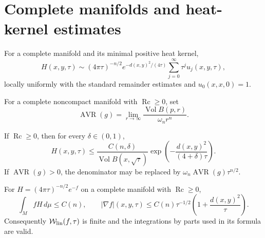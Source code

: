 \section{Complete manifolds and heat-kernel estimates}

\begin{theorem}
\label{thm:chow-ii-ch16-heat-parametrix}

For a complete manifold and its minimal positive heat kernel,
\[
H(x,y,\tau)\sim(4\pi\tau)^{-n/2}e^{-d(x,y)^2/(4\tau)}
 \sum_{j=0}^{\infty}\tau^ju_j(x,y,\tau),
\]
locally uniformly with the standard remainder estimates and
$u_0(x,x,0)=1$.
\end{theorem}

\begin{definition}
\label{def:chow-ii-ch16-avr}

For a complete noncompact manifold with $\operatorname{Rc}\ge0$, set
\[
\operatorname{AVR}(g)=\lim_{r\to\infty}
 \frac{\operatorname{Vol}B(p,r)}{\omega_nr^n}.
\]
\end{definition}

\begin{theorem}
\label{thm:chow-ii-ch16-heat-upper-bound}


If $\operatorname{Rc}\ge0$, then for every $\delta\in(0,1)$,
\[
H(x,y,\tau)\le\frac{C(n,\delta)}{\operatorname{Vol}B(x,\sqrt\tau)}
 \exp\!\left(-\frac{d(x,y)^2}{(4+\delta)\tau}\right).
\]
If $\operatorname{AVR}(g)>0$, the denominator may be replaced by
$\omega_n\operatorname{AVR}(g)\tau^{n/2}$.
\end{theorem}

\begin{corollary}
\label{cor:chow-ii-ch16-heat-integrability}


For $H=(4\pi\tau)^{-n/2}e^{-f}$ on a complete manifold with
$\operatorname{Rc}\ge0$,
\[
\int_M fH\,d\mu\le C(n),\qquad
|\nabla f|(x,y,\tau)\le C(n)\tau^{-1/2}\left(1+\frac{d(x,y)^2}{\tau}\right).
\]
Consequently $\mathcal W_{\rm lin}(f,\tau)$ is finite and the integrations by
parts used in its formula are valid.
\end{corollary}

